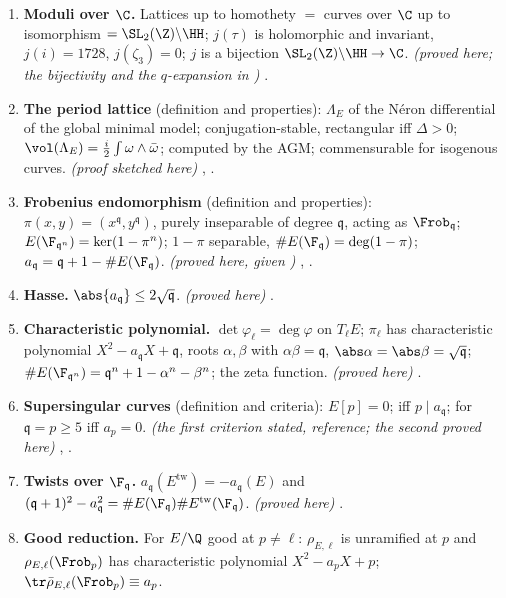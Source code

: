 \begin{enumerate}[label=\textbf{\thechapter.\arabic*}]
\item \textbf{Moduli over $\C$.} Lattices up to homothety $=$ curves over $\C$ up to isomorphism $=\SL_2(\Z)\backslash\HH$; $j(\tau)$ is holomorphic and invariant, $j(i)=1728$, $j(\zeta_3)=0$; $j$ is a bijection
$\SL_2(\Z)\backslash\HH\to\C$. \emph{(proved here; the bijectivity and the $q$-expansion in )} .
\item \textbf{The period lattice} (definition and properties): $\Lambda_E$ of the N\'eron differential of the global minimal model; conjugation-stable, rectangular iff $\Delta>0$; $\vol(\Lambda_E)=\frac i2\int\omega\wedge\bar\omega$;
computed by the AGM; commensurable for isogenous curves. \emph{(proof sketched here)} , .
\item \textbf{Frobenius endomorphism} (definition and properties): $\pi(x,y)=(x^{\mathfrak q},y^{\mathfrak q})$, purely inseparable of degree $\mathfrak q$, acting as $\Frob_{\mathfrak q}$; $E(\F_{\mathfrak q^n})=\ker(1-\pi^n)$; $1-\pi$
separable, $\#E(\F_{\mathfrak q})=\deg(1-\pi)$; $a_{\mathfrak q}=\mathfrak q+1-\#E(\F_{\mathfrak q})$. \emph{(proved here, given )} , .
\item \textbf{Hasse.} $\abs{a_{\mathfrak q}}\le2\sqrt{\mathfrak q}$. \emph{(proved here)} .
\item \textbf{Characteristic polynomial.} $\det\varphi_\ell=\deg\varphi$ on $T_\ell E$; $\pi_\ell$ has characteristic polynomial $X^2-a_{\mathfrak q}X+\mathfrak q$, roots $\alpha,\beta$ with $\alpha\beta=\mathfrak q$,
$\abs\alpha=\abs\beta=\sqrt{\mathfrak q}$; $\#E(\F_{\mathfrak q^n})=\mathfrak q^n+1-\alpha^n-\beta^n$; the zeta function. \emph{(proved here)} .
\item \textbf{Supersingular curves} (definition and criteria): $E[p]=0$; iff $p\mid a_{\mathfrak q}$; for $\mathfrak q=p\ge5$ iff $a_p=0$. \emph{(the first criterion stated, reference; the second proved here)}
, .
\item \textbf{Twists over $\F_{\mathfrak q}$.} $a_{\mathfrak q}(E^{\mathrm{tw}})=-a_{\mathfrak q}(E)$ and $(\mathfrak q+1)^2-a_{\mathfrak q}^2=\#E(\F_{\mathfrak q})\#E^{\mathrm{tw}}(\F_{\mathfrak q})$. \emph{(proved here)} .
\item \textbf{Good reduction.} For $E/\Q$ good at $p\ne\ell$: $\rho_{E,\ell}$ is unramified at $p$ and $\rho_{E,\ell}(\Frob_p)$ has characteristic polynomial $X^2-a_pX+p$; $\tr\bar\rho_{E,\ell}(\Frob_p)\equiv a_p$.

\end{enumerate}
